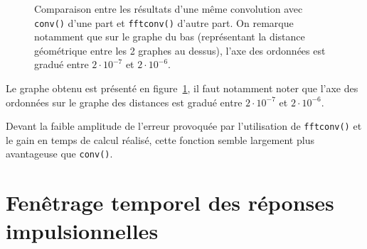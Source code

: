 \begin{figure}[h!]
\caption{\label{comp_conv_fftconv}Comparaison entre les résultats d'une même convolution avec \texttt{conv()} d'une part
et \texttt{fftconv()} d'autre part. On remarque notamment que sur le graphe du bas (représentant la distance géométrique
entre les 2 graphes au dessus), l'axe des ordonnées est gradué entre $2\cdot10^{-7}$ et $2\cdot10^{-6}$.}
\end{figure}

Le graphe obtenu est présenté en figure~\ref{comp_conv_fftconv}, il faut notamment noter que l'axe des ordonnées sur
le graphe des distances est gradué entre $2\cdot10^{-7}$ et $2\cdot10^{-6}$.

Devant la faible amplitude de l'erreur provoquée par l'utilisation de \texttt{fftconv()} et le gain en temps de calcul
réalisé, cette fonction semble largement plus avantageuse que \texttt{conv()}.

\section{Fenêtrage temporel des réponses impulsionnelles} %

